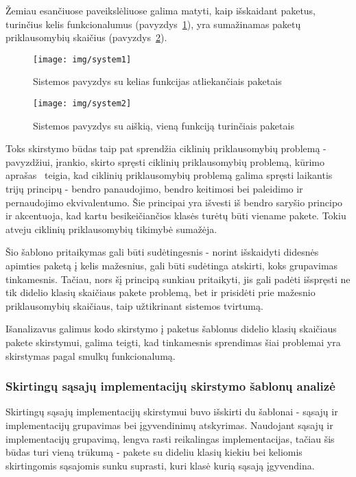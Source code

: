 Žemiau esančiuose paveikslėliuose galima matyti, kaip išskaidant paketus, turinčius kelis funkcionalumus (pavyzdys~\ref{img:excesive_deps}), yra sumažinamas paketų
priklausomybių skaičius (pavyzdys~\ref{img:good_deps}).
\begin{figure}[H]
    \centering
    \texttt{[image: img/system1]}
    \caption{Sistemos pavyzdys su kelias funkcijas atliekančiais paketais}
    \label{img:excesive_deps}
\end{figure}


\begin{figure}[H]
    \centering
    \texttt{[image: img/system2]}
    \caption{Sistemos pavyzdys su aiškią, vieną funkciją turinčiais paketais}
    \label{img:good_deps}
\end{figure}

Toks skirstymo būdas taip pat sprendžia ciklinių priklausomybių problemą - pavyzdžiui, įrankio, skirto spręsti ciklinių priklausomybių problemą,
kūrimo aprašas~\cite{CircularDependencies} teigia, kad ciklinių priklausomybių problemą galima spręsti laikantis trijų principų -
bendro panaudojimo, bendro keitimosi bei paleidimo ir pernaudojimo ekvivalentumo.
Šie principai yra išvesti iš bendro saryšio principo ir akcentuoja, kad kartu besikeičiančios klasės turėtų būti viename pakete.
Tokiu atveju ciklinių priklausomybių tikimybė sumažėja.

Šio šablono pritaikymas gali būti sudėtingesnis - norint išskaidyti didesnės apimties paketą į kelis mažesnius, gali būti
sudėtinga atskirti, koks grupavimas tinkamesnis.
Tačiau, nors šį principą sunkiau pritaikyti, jis gali padėti išspręsti ne tik didelio klasių skaičiaus pakete problemą,
bet ir prisidėti prie mažesnio priklausomybių skaičiaus, taip užtikrinant sistemos tvirtumą.

Išanalizavus galimus kodo skirstymo į paketus šablonus didelio klasių skaičiaus pakete skirstymui, galima teigti, kad tinkamesnis sprendimas šiai
problemai yra skirstymas pagal smulkų funkcionalumą.


\subsubsection{Skirtingų sąsajų implementacijų skirstymo šablonų analizė}
Skirtingų sąsajų implementacijų skirstymui buvo išskirti du šablonai - sąsajų ir implementacijų grupavimas bei
įgyvendinimų atskyrimas.
Naudojant sąsajų ir implementacijų grupavimą, lengva rasti reikalingas implementacijas, tačiau šis būdas
turi vieną trūkumą - pakete su dideliu klasių kiekiu bei keliomis skirtingomis sąsajomis sunku suprasti, kuri klasė kurią sąsają įgyvendina.

